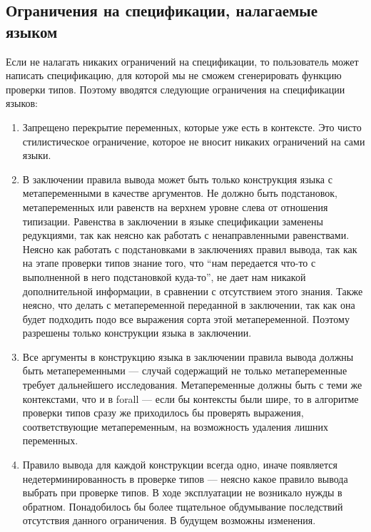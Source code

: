 \subsection{Ограничения на спецификации, налагаемые языком}\label{constraints}

Если не налагать никаких ограничений на спецификации, то пользователь может написать спецификацию, для которой мы не сможем сгенерировать функцию проверки типов. Поэтому вводятся следующие ограничения на спецификации языков:

\begin{enumerate}
\item Запрещено перекрытие переменных, которые уже есть в контексте. Это чисто стилистическое ограничение, которое не вносит никаких ограничений на сами языки.

\item В заключении правила вывода может быть только конструкция языка с метапеременными в качестве аргументов. Не должно быть подстановок, метапеременных или равенств на верхнем уровне слева от отношения типизации. Равенства в заключении в языке спецификации заменены редукциями, так как неясно как работать с ненаправленными равенствами. Неясно как работать с подстановками в заключениях правил вывода, так как на этапе проверки типов знание того, что ``нам передается что-то с выполненной в него подстановкой куда-то'', не дает нам никакой дополнительной информации, в сравнении с отсутствием этого знания. Также неясно, что делать с метапеременной переданной в заключении, так как она будет подходить подо все выражения сорта этой метапеременной. Поэтому разрешены только конструкции языка в заключении.

\item Все аргументы в конструкцию языка в заключении правила вывода должны быть метапеременными --- случай содержащий не только метапеременные требует дальнейшего исследования. Метапеременные должны быть с теми же контекстами, что и в forall --- если бы контексты были шире, то в алгоритме проверки типов сразу же приходилось бы проверять выражения, соответствующие метапеременным, на возможность удаления лишних переменных.

\item \label{one_per_fun} Правило вывода для каждой конструкции всегда одно, иначе появляется недетерминированность в проверке типов --- неясно какое правило вывода выбрать при проверке типов. В ходе эксплуатации не возникало нужды в обратном. Понадобилось бы более тщательное обдумывание последствий отсутствия данного ограничения. В будущем возможны изменения.


\end{enumerate}
